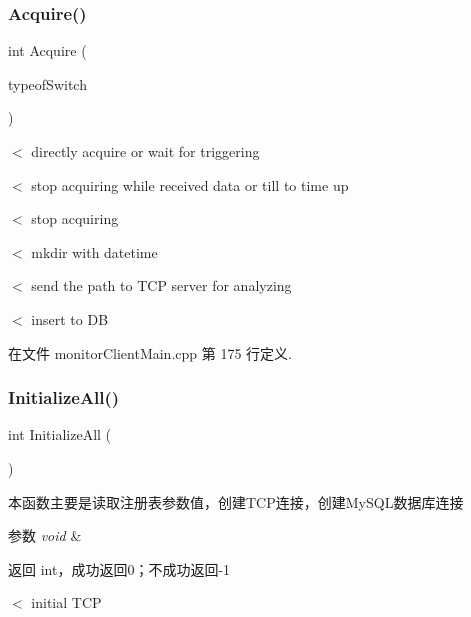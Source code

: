 \subsubsection{\texorpdfstring{Acquire()}{Acquire()}}
{\footnotesize\ttfamily int Acquire (\begin{DoxyParamCaption}\item[{\hyperlink{_c_udp_server_8h_a41273fdeb63230b3a5c360d8c7c11b82}{S\+W\+I\+T\+C\+H\+\_\+\+T\+Y\+PE}}]{typeof\+Switch }\end{DoxyParamCaption})\hspace{0.3cm}{\ttfamily [private]}}

$<$ directly acquire or wait for triggering

$<$ stop acquiring while received data or till to time up

$<$ stop acquiring

$<$ mkdir with datetime

$<$ send the path to T\+CP server for analyzing

$<$ insert to DB 

在文件 monitor\+Client\+Main.\+cpp 第 175 行定义.

\mbox{\label{classmonitor_client_frame_a06d8b6cb7153736934b17fca7fd5c715}} 
\subsubsection{\texorpdfstring{Initialize\+All()}{InitializeAll()}}
{\footnotesize\ttfamily int Initialize\+All (\begin{DoxyParamCaption}\item[{void}]{ }\end{DoxyParamCaption})\hspace{0.3cm}{\ttfamily [private]}}



本函数主要是读取注册表参数值，创建\+T\+C\+P连接，创建\+My\+S\+Q\+L数据库连接 


\begin{DoxyParams}{参数}
{\em void} & \\
\hline
\end{DoxyParams}
\begin{DoxyReturn}{返回}
int，成功返回0；不成功返回-\/1 
\end{DoxyReturn}
$<$ initial T\+CP 

